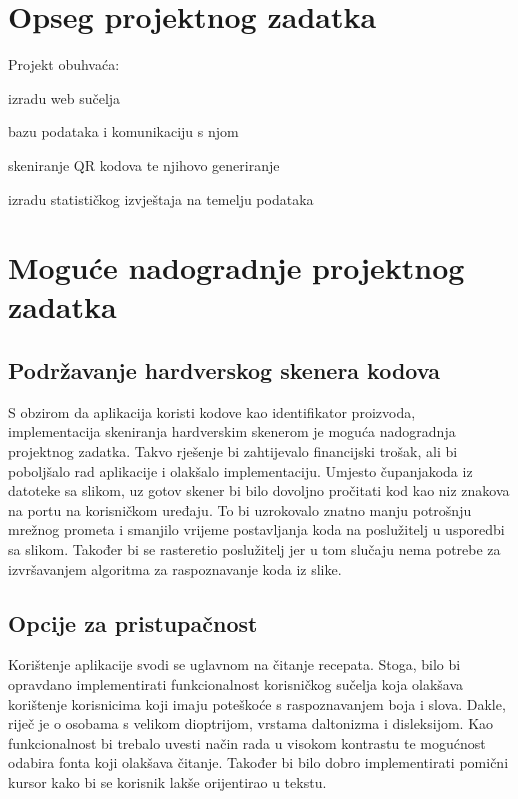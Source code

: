 	\section{Opseg projektnog zadatka}
	Projekt obuhvaća:
	\begin{packed_item}
 		\item izradu web sučelja
		\item bazu podataka i komunikaciju s njom
		\item skeniranje QR kodova te njihovo generiranje
		\item izradu statističkog izvještaja na temelju podataka
	\end{packed_item}

	\section{Moguće nadogradnje projektnog zadatka}
		\subsection{Podržavanje hardverskog skenera kodova}
			S obzirom da aplikacija koristi kodove kao identifikator proizvoda, implementacija skeniranja hardverskim skenerom je moguća nadogradnja projektnog zadatka. Takvo rješenje bi zahtijevalo financijski trošak, ali bi poboljšalo rad aplikacije i olakšalo implementaciju. Umjesto \glqq čupanja\grqq koda iz datoteke sa slikom, uz gotov skener bi bilo dovoljno pročitati kod kao niz znakova na portu na korisničkom uređaju. To bi uzrokovalo znatno manju potrošnju mrežnog prometa i smanjilo vrijeme postavljanja koda na poslužitelj u usporedbi sa slikom. Također bi se rasteretio poslužitelj jer u tom slučaju nema potrebe za izvršavanjem algoritma za raspoznavanje koda iz slike.
	
		\subsection{Opcije za pristupačnost}
 			Korištenje aplikacije svodi se uglavnom na čitanje recepata. Stoga, bilo bi opravdano implementirati funkcionalnost korisničkog sučelja koja olakšava korištenje korisnicima koji imaju poteškoće s raspoznavanjem boja i slova. Dakle, riječ je o osobama s velikom dioptrijom, vrstama daltonizma i disleksijom. Kao funkcionalnost bi trebalo uvesti način rada u visokom kontrastu te mogućnost odabira fonta koji olakšava čitanje. Također bi bilo dobro implementirati pomični kursor kako bi se korisnik lakše orijentirao u tekstu. 

